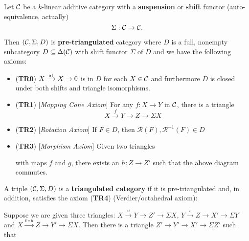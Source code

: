 \documentclass[12pt]{article}
\begin{document}
\begin{defn}
	Let $\cal C$ be a $k$-linear additive category with a \textbf{suspension} or \textbf{shift} functor (auto-equivalence, actually)
	\[\Sigma:\cal C\to\cal C.\]

	Then $({\mathcal{C}}, \Sigma ,D)$ is \textbf{pre-triangulated} category where $D$ is a full, nonempty subcategory $D\subseteq\Delta(\cal C)$
	with shift functor $\Sigma$ of $D$ and we have the following axioms:
	\begin{itemize}
		\item (\textbf{TR0}) $X\xrightarrow{\operatorname{id}} X\to 0$ is in $D$ for each $X\in \cal C$ and furthermore $D$ is closed under both shifts and triangle isomorphisms.
		\item (\textbf{TR1}) [\textit{Mapping Cone Axiom}] For any $f:X\to Y$ in $\cal C$, there is a triangle
		\[X\xrightarrow{f} Y\to Z\to\Sigma X\]
		\item (\textbf{TR2}) [\textit{Rotation Axiom}] If $F\in D$, then $\mathscr R(F),\mathscr R^{-1}(F)\in D$
		\item (\textbf{TR3}) [\textit{Morphism Axiom}] Given two triangles 
		\begin{center}
		\end{center}
		with maps $f$ and $g$, there exists an $h:Z\to Z'$ such that the above diagram commutes.
	\end{itemize}
\end{defn}
\begin{defn}
	A triple $(\mathcal{C},\Sigma, D)$ is a \textbf{triangulated category} if it is pre-triangulated and, in addition,
	satisfies the axiom (\textbf{TR4}) (Verdier/octahedral axiom):

	Suppose we are given three triangles: $X\xrightarrow{u}Y\to Z'\to\Sigma X$, $Y\xrightarrow{v}Z\to X'\to\Sigma Y$
	and $X\xrightarrow{v\circ u} Z\to Y'\to\Sigma X$. Then there is a triangle $Z'\to Y'\to X'\to\Sigma Z'$ such that
	\begin{center}
	\end{center}
\end{defn}
\end{document}

